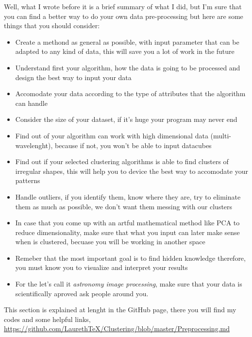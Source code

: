 \documentclass[11pt,fleqn]{book} %
\begin{document}
Well, what I wrote before it is a brief summary of what I did, but I'm sure that you can find a better way to do your own data pre-processing but here are some things that you should consider:
	\begin{itemize}
    	\item Create a methond as general as possible, with input parameter that can be adapted to any kind of data, this will save you a lot of work in the future
        \item Understand first your algorithm, how the data is going to be processed and design the best way to input your data
        \item Accomodate your data according to the type of attributes that the algorithm can handle
        \item Consider the size of your dataset, if it's huge your program may never end
        \item Find out of your algorithm can work with high dimensional data (multi-wavelenght), because if not, you won't be able to input datacubes
        \item Find out if your selected clustering algorithms is able to find clusters of irregular shapes, this will help you to device the best way to accomodate your patterns
        \item Handle outliers, if you identify them, know where they are, try to eliminate them as much as possible, we don't want them messing with our clusters
        \item In case that you come up with an artful mathematical method like PCA to reduce dimensionality, make sure that what you input can later make sense when is clustered, becuase you will be working in another space
        \item Remeber that the most important goal is to find hidden knowledge therefore, you must know you to visualize and interpret your results
        \item For the let's call it \emph{astronomy image processing}, make sure that your data is scientifically aproved ask people around you.
    \end{itemize}


This section is explained at lenght in the GitHub page, there you will find my codes and some helpful links, \url{https://github.com/LaurethTeX/Clustering/blob/master/Preprocessing.md}
\end{document}
